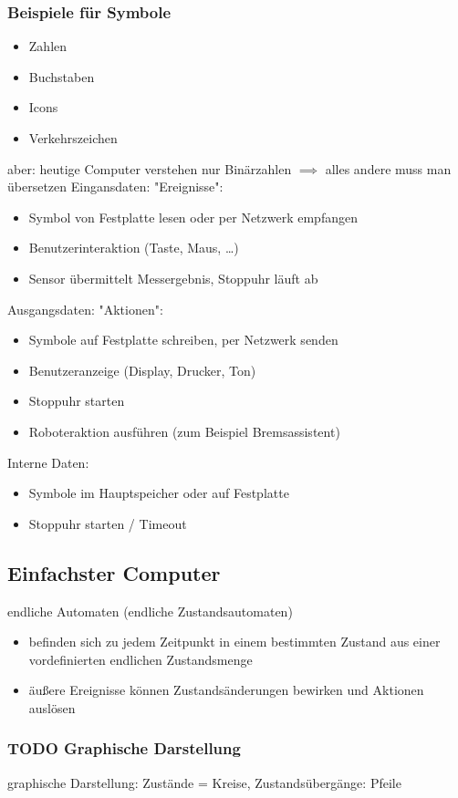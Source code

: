 \documentclass[a4paper]{scrartcl}
\theoremstyle{definition}
\theoremstyle{plain}
\theoremstyle{remark}
\theoremstyle{remark}
\begin{document}
\subsubsection{Beispiele für Symbole}
\label{sec-3-2-1}
\begin{itemize}
\item Zahlen
\item Buchstaben
\item Icons
\item Verkehrszeichen
\end{itemize}
aber: heutige Computer verstehen nur Binärzahlen $\implies$ alles andere muss man übersetzen
Eingansdaten: "Ereignisse":
\begin{itemize}
\item Symbol von Festplatte lesen oder per Netzwerk empfangen
\item Benutzerinteraktion (Taste, Maus, \ldots{})
\item Sensor übermittelt Messergebnis, Stoppuhr läuft ab
\end{itemize}
Ausgangsdaten: "Aktionen":
\begin{itemize}
\item Symbole auf Festplatte schreiben, per Netzwerk senden
\item Benutzeranzeige (Display, Drucker, Ton)
\item Stoppuhr starten
\item Roboteraktion ausführen (zum Beispiel Bremsassistent)
\end{itemize}
Interne Daten:
\begin{itemize}
\item Symbole im Hauptspeicher oder auf Festplatte
\item Stoppuhr starten / Timeout
\end{itemize}
\subsection{Einfachster Computer}
\label{sec-3-3}
endliche Automaten (endliche Zustandsautomaten)
\begin{itemize}
\item befinden sich zu jedem Zeitpunkt in einem bestimmten Zustand aus einer vordefinierten endlichen Zustandsmenge
\item äußere Ereignisse können Zustandsänderungen bewirken und Aktionen auslösen
\end{itemize}
\subsubsection{{\bfseries\sffamily TODO} Graphische Darstellung}
\label{sec-3-3-1}
graphische Darstellung: Zustände = Kreise, Zustandsübergänge: Pfeile
\end{document}
